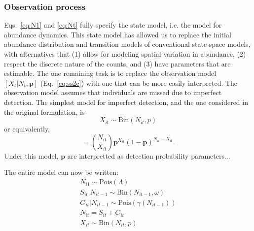 \documentclass[12pt]{article}
\begin{document}

\subsubsection{Observation process}

Eqs.~\ref{eq:N1} and \ref{eq:Nt} fully specify the state model,
i.e. the model for abundance dynamics. This state
model has allowed us to replace the initial abundance
distribution and transition models of conventional state-space models, with
alternatives that (1) allow for modeling spatial variation in
abundance, (2) respect the discrete nature of the counts, and
(3) have parameters that are estimable. The one
remaining task is to replace the observation model
$[X_t|N_t, \bm{p}]$ (Eq.~\ref{eq:ss2c}) with one that can be
more easily interpreted. The observation
model assumes that individuals are missed due to imperfect
detection. The simplest model for imperfect detection, and the
one considered in the original formulation, is
\begin{equation}
  X_{it} \sim \mathrm{Bin}(N_{it}, p)
  \label{eq:p1}
\end{equation}
or equivalently,
\begin{equation}
[X_{it} | N_{it}, \bm{p}] = \binom{N_{it}}{X_{it}}
\bm{p}^{X_{it}}(1-\bm{p})^{N_{it}-X_{it}}.
  \label{eq:1}
\end{equation}
Under this model, $\bm{p}$ are interpretted as detection
probability
parameters...


The entire model can now be written:
\begin{gather}
  N_{i1} \sim \text{Pois}(\Lambda) \nonumber \\
S_{it}|N_{it-1} \sim \mathrm{Bin}(N_{it-1}, \omega) \nonumber \\  
G_{it}|N_{it-1}\sim \mathrm{Pois}(\gamma(N_{it-1})) \\
  N_{it} = S_{it}+G_{it} \nonumber \\
  X_{it} \sim \text{Bin}(N_{it}, p) \nonumber
  \label{eq:hm}
\end{gather}
\end{document}
